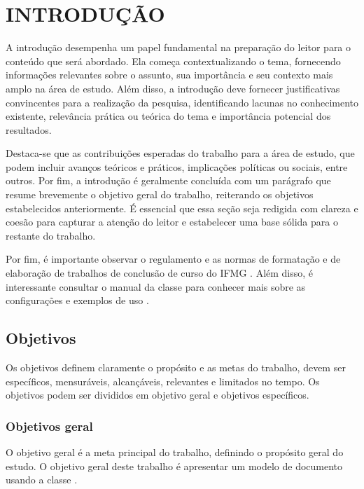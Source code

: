 \documentclass[artigo]{iftex2024}
\begin{document}
\maketitle

\section{INTRODUÇÃO}

A introdução desempenha um papel fundamental na preparação do leitor para o conteúdo que será abordado.
Ela começa contextualizando o tema, fornecendo informações relevantes sobre o assunto, sua importância e seu contexto mais amplo na área de estudo.
Além disso, a introdução deve fornecer justificativas convincentes para a realização da pesquisa, identificando lacunas no conhecimento existente, relevância prática ou teórica do tema e importância potencial dos resultados.

Destaca-se que as contribuições esperadas do trabalho para a área de estudo, que podem incluir avanços teóricos e práticos, implicações políticas ou sociais, entre outros.
Por fim, a introdução é geralmente concluída com um parágrafo que resume brevemente o objetivo geral do trabalho, reiterando os objetivos estabelecidos anteriormente.
É essencial que essa seção seja redigida com clareza e coesão para capturar a atenção do leitor e estabelecer uma base sólida para o restante do trabalho.

Por fim, é importante observar o regulamento e as normas de formatação e de elaboração de trabalhos de conclusão de curso do IFMG \cite{ifmg:2020:manual,ifmg:2021:tcc}.
Além disso, é interessante consultar o manual da classe {\iftex} para conhecer mais sobre as configurações e exemplos de uso \cite{ribeiro:2024:iftex}.

\subsection{Objetivos}

Os objetivos definem claramente o propósito e as metas do trabalho, devem ser específicos, mensuráveis, alcançáveis, relevantes e limitados no tempo.
Os objetivos podem ser divididos em objetivo geral e objetivos específicos.

\subsubsection{Objetivos geral}

O objetivo geral é a meta principal do trabalho, definindo o propósito geral do estudo.
O objetivo geral deste trabalho é apresentar um modelo de documento usando a classe \iftex.
\end{document}
